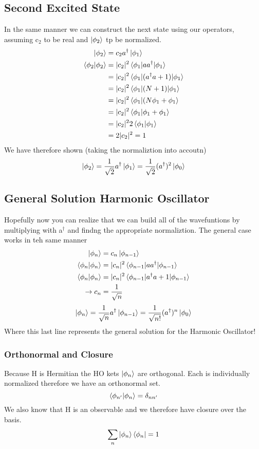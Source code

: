 \documentclass{article}
\newcommand{\be}{\begin{equation}}
\newcommand{\ee}{\end{equation}}
\newcommand{\dg}{\dagger}
\begin{document}
\subsection*{Second Excited State}
In the same manner we can construct the next state using our operators, assuming c$_2$ to be real and $\ket{\phi_2}$ tp be normalized. 
\be
\begin{split}
    \ket{\phi_2} &= c_2 a^\dg\ket{\phi_1}\\
    \braket{\phi_2|\phi_2} &= |c_2|^2 \braket{\phi_1|aa^\dg|\phi_1}\\
    &= |c_2|^2 \braket{\phi_1|(a^\dg a + 1)|\phi_1}\\
    &= |c_2|^2 \braket{\phi_1|(N + 1)|\phi_1}\\
    &= |c_2|^2 \braket{\phi_1|(N\phi_1 + \phi_1}\\
    &= |c_2|^2 \braket{\phi_1|\phi_1 + \phi_1}\\
    &= |c_2|^2 2\braket{\phi_1|\phi_1}\\
    &= 2|c_2|^2  = 1
\end{split}
\ee
We have therefore shown (taking the normaliztion into accoutn)
\be
\ket{\phi_2} = \frac{1}{\sqrt{2}}a^\dg\ket{\phi_1} = \frac{1}{\sqrt{2}}(a^\dg)^2\ket{\phi_0}
\ee

\subsection*{General Solution Harmonic Oscillator}
Hopefully now you can realize that we can build all of the wavefuntions by multiplying with a$^\dg$ and findng the appropriate normaliztion. 
The general case works in teh same manner
\be
\begin{split}
    \ket{\phi_n} &= c_n \ket{\phi_{n-1}}\\
    \braket{\phi_n|\phi_n} &= |c_n|^2 \braket{\phi_{n-1}|aa^\dg|\phi_{n-1}}\\
    \braket{\phi_n|\phi_n} &= |c_n|^2 \braket{\phi_{n-1}|a^\dg a + 1|\phi_{n-1}}\\
    \rightarrow c_n &= \frac{1}{\sqrt{n}}
\end{split}
\ee
\be
\ket{\phi_n} = \frac{1}{\sqrt{n}}a^\dg \ket{\phi_{n-1}} = \frac{1}{\sqrt{n!}}(a^\dg)^n \ket{\phi_0}
\ee
Where this last line represents the general solution for the Harmonic Oscillator!

\subsubsection*{Orthonormal and Closure}
Because H is Hermitian the HO kets $\ket{\phi_n}$ are orthogonal.
Each is individually normalized therefore we have an orthonormal set.
\be
\braket{\phi_{n'} | \phi_n} = \delta_{nn'}
\ee
We also know that H is an observable and we therefore have closure over the basis.
\be
\sum_n \ket{\phi_n} \bra{\phi_n} = 1
\ee
\end{document}
